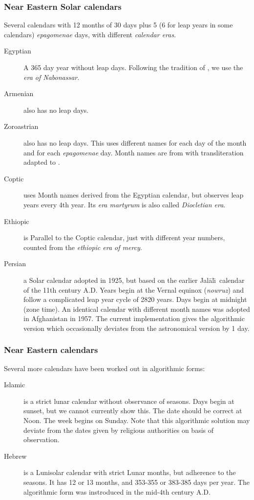 \subsubsection{Near Eastern Solar calendars}
Several calendars with 12 months of 30 days plus 5 (6 for leap years
in some calendars) \emph{epagomenae} days, with different \emph{calendar eras}.
\begin{description}
\item[Egyptian] A 365 day year without leap days. Following the
  tradition of , we use the \emph{era of Nabonassar}.
\item[Armenian] also has no leap days.
\item[Zoroastrian] also has no leap days. This uses different names
  for each day of the month and for each \emph{epagomenae} day. Month
  names are from \citet[\S69]{Ginzel:ChronologieI} with
  transliteration adapted to \citet{Reingold-Dershowitz:2018}.
\item[Coptic] uses Month names derived from the Egyptian calendar, but observes
  leap years every 4th year. Its \emph{era martyrum} is also called
  \emph{Diocletian era}.
\item[Ethiopic] is Parallel to the Coptic calendar, just with different
  year numbers, counted from the \emph{ethiopic era of mercy}.
\item[Persian] a Solar calendar adopted in 1925, 
  but based on the earlier Jal\=al\=\i\ calendar of the 11th century
  A.D. Years begin at the Vernal equinox (\emph{nowruz}) and follow a
  complicated leap year cycle of 2820 years. Days begin at midnight
  (zone time). An identical calendar with different month names was
  adopted in Afghanistan in 1957. The current implementation gives the
  algorithmic version which occasionally deviates from the
  astronomical version by 1 day.
\end{description}

\subsubsection{Near Eastern calendars}
Several more calendars  have been worked out in algorithmic forms:
\begin{description}
\item[Islamic] is a strict lunar calendar without observance of
  seasons. Days begin at sunset, but we cannot currently show
  this. The date should be correct at Noon. The week begins on
  Sunday. Note that this algorithmic solution may deviate from the
  dates given by religious authorities on basis of observation.
\item[Hebrew] is a Lunisolar calendar with strict Lunar months, but
  adherence to the seasons. It has 12 or 13 months, and 353-355 or
  383-385 days per year. The algorithmic form was instroduced in the
  mid-4th century A.D.
\end{description}


